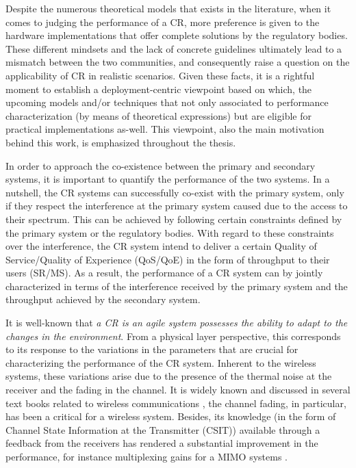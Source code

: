 Despite the numerous theoretical models that exists in the literature, when it comes to judging the performance of a CR, more preference is given to the hardware implementations that offer complete solutions by the regulatory bodies. These different mindsets and the lack of concrete guidelines ultimately lead to a mismatch between the two communities, and consequently raise a question on the applicability of CR in realistic scenarios. Given these facts, it is a rightful moment to establish a deployment-centric viewpoint based on which, the upcoming models and/or techniques that not only associated to performance characterization (by means of theoretical expressions) but are eligible for practical implementations as-well. This viewpoint, also the main motivation behind this work, is emphasized throughout the thesis. 

In order to approach the co-existence between the primary and secondary systems, it is important to quantify the performance of the two systems. In a nutshell, the CR systems can successfully co-exist with the primary system, only if they respect the interference at the primary system caused due to the access to their spectrum. This can be achieved by following certain constraints defined by the primary system or the regulatory bodies. With regard to these constraints over the interference, the CR system intend to deliver a certain Quality of Service/Quality of Experience (QoS/QoE) in the form of throughput to their users (SR/MS). As a result, the performance of a CR system can by jointly characterized in terms of the interference received by the primary system and the throughput achieved by the secondary system. 

It is well-known that \textit{a CR is an agile system possesses the ability to adapt to the changes in the environment}. From a physical layer perspective, this corresponds to its response to the variations in the parameters that are crucial for characterizing the performance of the CR system. Inherent to the wireless systems, these variations arise due to the presence of the thermal noise at the receiver and the fading in the channel. It is widely known and discussed in several text books related to wireless communications \cite{simon2005, Goldsmith05, Tse05}, the channel fading, in particular, has been a critical for a wireless system. Besides, its knowledge (in the form of Channel State Information at the Transmitter (CSIT)) available through a feedback from the receivers has rendered a substantial improvement in the performance, for instance multiplexing gains for a MIMO systems \cite{Ali12}. 



